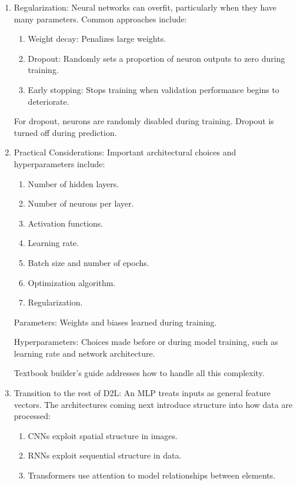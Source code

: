 \documentclass{article}
\begin{document}
\begin{enumerate}
\item Regularization: Neural networks can overfit, particularly when they have many parameters.
Common approaches include:
\begin{enumerate}
\item Weight decay: Penalizes large weights.
\item Dropout: Randomly sets a proportion of neuron outputs to zero during training.
\item Early stopping: Stops training when validation performance begins to deteriorate.
\end{enumerate}
For dropout, neurons are randomly disabled during training. Dropout is turned off during prediction.

\item Practical Considerations:
Important architectural choices and hyperparameters include:
\begin{enumerate}
\item Number of hidden layers.
\item Number of neurons per layer.
\item Activation functions.
\item Learning rate.
\item Batch size and number of epochs.
\item Optimization algorithm.
\item Regularization.
\end{enumerate}
Parameters: Weights and biases learned during training.

Hyperparameters: Choices made before or during model training, such as learning rate and network architecture.

Textbook builder's guide addresses how to handle all this complexity.

\item Transition to the rest of D2L: An MLP treats inputs as general feature vectors. The architectures coming next introduce structure into how data are processed:
\begin{enumerate}
\item CNNs exploit spatial structure in images.
\item RNNs exploit sequential structure in data.
\item Transformers use attention to model relationships between elements.
\end{enumerate}
\end{enumerate}
\end{document}
